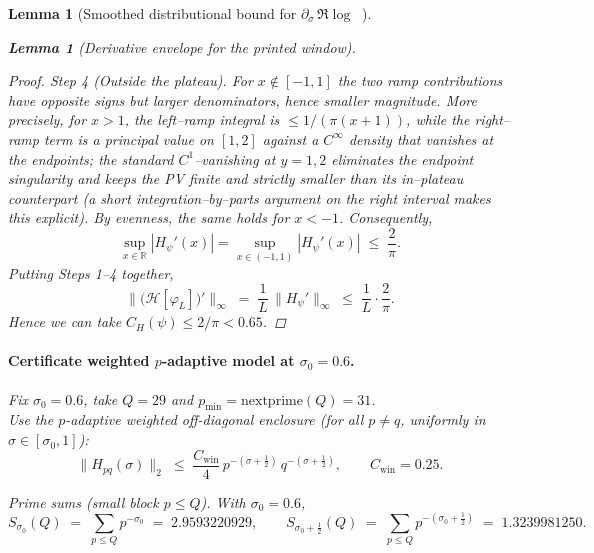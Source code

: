 \documentclass[11pt]{article}
\newtheorem{lemma}[theorem]{Lemma}
\theoremstyle{definition}
\theoremstyle{remark}
\DeclareMathOperator{\dettwo}{det_2}
\begin{document}
\begin{lemma}[Smoothed distributional bound for $\partial_\sigma\,\Re\log\dettwo$]
\begin{lemma}[Derivative envelope for the printed window]
\begin{proof}
\smallskip
\textit{Step 4 (Outside the plateau).} For $x\notin[-1,1]$ the two ramp contributions have opposite signs but larger denominators, hence smaller magnitude. More precisely, for $x>1$, the left–ramp integral is 
$\le 1/(\pi(x+1))$, while the right–ramp term is a principal value on $[1,2]$ against a $C^\infty$ density that vanishes at the endpoints; the standard $C^1$–vanishing at $y=1,2$ eliminates the endpoint singularity and keeps the PV finite and strictly smaller than its in–plateau counterpart (a short integration–by–parts argument on the right interval makes this explicit). By evenness, the same holds for $x<-1$.  Consequently,
\[
  \sup_{x\in\mathbb R}|H_\psi'(x)|=\sup_{x\in(-1,1)}|H_\psi'(x)|\;\le\;\frac{2}{\pi}.
\]
Putting Steps 1–4 together,
\[
  \big\|\big(\mathcal H[\varphi_L]\big)'\big\|_\infty
  \;=\;\frac{1}{L}\,\|H_\psi'\|_\infty
  \;\le\;\frac{1}{L}\cdot\frac{2}{\pi}.
\]
Hence we can take $C_H(\psi)\le 2/\pi < 0.65$.
\end{proof}

\end{lemma}


\paragraph*{Certificate \textemdash{} weighted \(p\)-adaptive model at \(\sigma_0=0.6\).}
Fix \(\sigma_0=0.6\), take \(Q=29\) and \(p_{\min}=\mathrm{nextprime}(Q)=31\).\\
Use the \(p\)-adaptive weighted off-diagonal enclosure (for all \(p\neq q\), uniformly in \(\sigma\in[\sigma_0,1]\)):
\[
\|H_{pq}(\sigma)\|_2 \;\le\; \frac{C_{\mathrm{win}}}{4}\, p^{-(\sigma+\tfrac12)}\, q^{-(\sigma+\tfrac12)},
\qquad C_{\mathrm{win}}=0.25.
\]

\noindent\emph{Prime sums (small block \(p\le Q\)).} With \(\sigma_0=0.6\),
\[
S_{\sigma_0}(Q)\;=\;\sum_{p\le Q} p^{-\sigma_0}\;=\;2.9593220929,\qquad
S_{\sigma_0+\tfrac12}(Q)\;=\;\sum_{p\le Q} p^{-(\sigma_0+\tfrac12)}\;=\;1.3239981250.
\]



\end{lemma}
\end{document}
